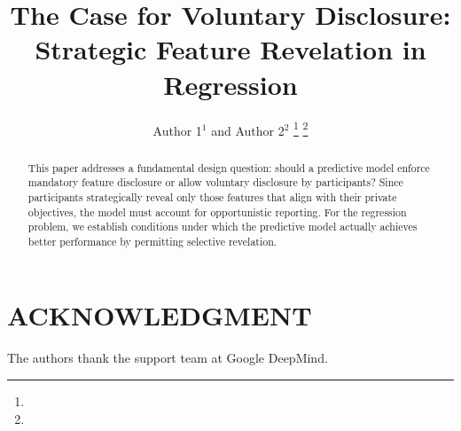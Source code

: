 \documentclass[letterpaper, 10 pt, conference]{ieeeconf} %
\title{\LARGE \bf
The Case for Voluntary Disclosure: Strategic Feature Revelation in Regression
}
\author{Author 1$^{1}$ and Author 2$^{2}$%
\thanks{}%
\thanks{}%
}
\begin{document}
\maketitle
\pagestyle{plain}

\begin{abstract}
This paper addresses a fundamental design question: should a predictive model enforce mandatory feature disclosure or allow voluntary disclosure by participants? Since participants strategically reveal only those features that align with their private objectives, the model must account for opportunistic reporting. For the regression problem, we establish conditions under which the predictive model actually achieves better performance by permitting selective revelation.
\end{abstract}












\section*{ACKNOWLEDGMENT}
The authors thank the support team at Google DeepMind.




\end{document}
